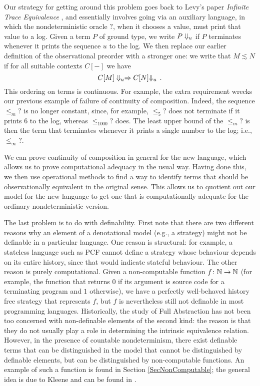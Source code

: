 Our strategy for getting around this problem goes back to Levy's paper \emph{Infinite Trace Equivalence} \cite{LevyGsInfinite}, and essentially involves going via an auxiliary language, in which the nondeterministic oracle $?$, when it chooses a value, must print that value to a log.  
Given a term $P$ of ground type, we write $P\Downarrow_u$ if $P$ terminates whenever it prints the sequence $u$ to the log.  
We then replace our earlier definition of the observational preorder with a stronger one: we write that $M\lesssim N$ if for all suitable contexts $C[-]$ we have
\[
  C[M] \Downarrow_u \mathrel{\Rightarrow C[N]} \Downarrow_u\,.
  \]
This ordering on terms is continuous.
For example, the extra requirement wrecks our previous example of failure of continuity of composition.  
Indeed, the sequence $\le_m ?$ is no longer constant, since, for example, $\le_5 ?$ does not terminate if it prints $6$ to the log, whereas $\le_{1000} ?$ does.
The least upper bound of the $\le_m?$ is then the term that terminates whenever it prints a single number to the log; i.e., $\le_\infty ?$.

We can prove continuity of composition in general for the new language, which allows us to prove computational adequacy in the usual way.
Having done this, we then use operational methods to find a way to identify terms that should be observationally equivalent in the original sense.  
This allows us to quotient out our model for the new language to get one that is computationally adequate for the ordinary nondeterministic version.

The last problem is to do with definability.
First note that there are two different reasons why an element of a denotational model (e.g., a strategy) might not be definable in a particular language.  
One reason is structural: for example, a stateless language such as PCF cannot define a strategy whose behaviour depends on its entire history, since that would indicate stateful behaviour.  
The other reason is purely computational.  
Given a non-computable function $f\colon \mathbb{N} \to \mathbb{N}$ (for example, the function that returns $0$ if its argument is source code for a terminating program and $1$ otherwise), we have a perfectly well-behaved history free strategy that represents $f$, but $f$ is nevertheless still not definable in most programming languages.  
Historically, the study of Full Abstraction has not been too concerned with non-definable elements of the second kind: the reason is that they do not usually play a role in determining the intrinsic equivalence relation.
However, in the presence of countable nondeterminism, there exist definable terms that can be distinguished in the model that cannot be distinguished by definable elements, but can be distinguished by non-computable functions.
An example of such a function is found in Section \ref{SecNonComputable}; the general idea is due to Kleene and can be found in \cite{KleeneTree}.

